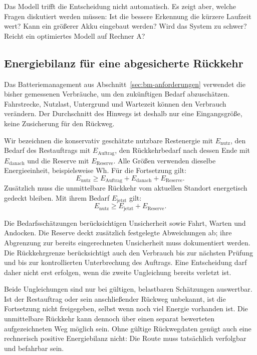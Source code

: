 Das Modell trifft die Entscheidung nicht automatisch. Es zeigt aber, welche Fragen diskutiert werden müssen: Ist die bessere Erkennung die kürzere Laufzeit wert? Kann ein größerer Akku eingebaut werden? Wird das System zu schwer? Reicht ein optimiertes Modell auf Rechner A?

\subsection{Energiebilanz für eine abgesicherte Rückkehr}
\label{sec:bm-energie}
Das Batteriemanagement aus Abschnitt~\ref{sec:bm-anforderungen} verwendet die bisher gemessenen Verbräuche, um den zukünftigen Bedarf abzuschätzen. Fahrstrecke, Nutzlast, Untergrund und Wartezeit können den Verbrauch verändern. Der Durchschnitt des Hinwegs ist deshalb nur eine Eingangsgröße, keine Zusicherung für den Rückweg.

Wir bezeichnen die konservativ geschätzte nutzbare Restenergie mit \(E_{\mathrm{nutz}}\), den Bedarf des Restauftrags mit \(E_{\mathrm{Auftrag}}\), den Rückkehrbedarf nach dessen Ende mit \(E_{\mathrm{danach}}\) und die Reserve mit \(E_{\mathrm{Reserve}}\). Alle Größen verwenden dieselbe Energieeinheit, beispielsweise Wh. Für die Fortsetzung gilt:
\[
E_{\mathrm{nutz}} \geq E_{\mathrm{Auftrag}} + E_{\mathrm{danach}} + E_{\mathrm{Reserve}}.
\]
Zusätzlich muss die unmittelbare Rückkehr vom aktuellen Standort energetisch gedeckt bleiben. Mit ihrem Bedarf \(E_{\mathrm{jetzt}}\) gilt:
\[
E_{\mathrm{nutz}} \geq E_{\mathrm{jetzt}} + E_{\mathrm{Reserve}}.
\]

Die Bedarfsschätzungen berücksichtigen Unsicherheit sowie Fahrt, Warten und Andocken. Die Reserve deckt zusätzlich festgelegte Abweichungen ab; ihre Abgrenzung zur bereits eingerechneten Unsicherheit muss dokumentiert werden. Die Rückkehrgrenze berücksichtigt auch den Verbrauch bis zur nächsten Prüfung und bis zur kontrollierten Unterbrechung des Auftrags. Eine Entscheidung darf daher nicht erst erfolgen, wenn die zweite Ungleichung bereits verletzt ist.

Beide Ungleichungen sind nur bei gültigen, belastbaren Schätzungen auswertbar. Ist der Restauftrag oder sein anschließender Rückweg unbekannt, ist die Fortsetzung nicht freigegeben, selbst wenn noch viel Energie vorhanden ist. Die unmittelbare Rückkehr kann dennoch über einen separat bewerteten aufgezeichneten Weg möglich sein. Ohne gültige Rückwegdaten genügt auch eine rechnerisch positive Energiebilanz nicht: Die Route muss tatsächlich verfolgbar und befahrbar sein.

